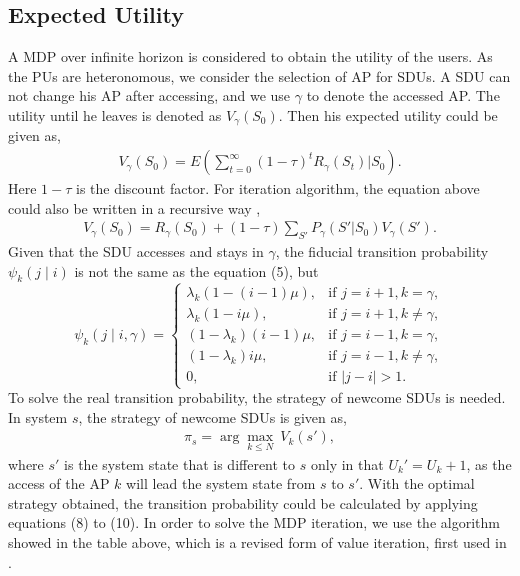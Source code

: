 \documentclass[conference]{IEEEtran}
\begin{document}
\subsection{Expected Utility}
A MDP over infinite horizon is considered to obtain the utility of the users. As the PUs are heteronomous, we consider the selection of AP for SDUs. A SDU can not change his AP after accessing, and we use \(\gamma\) to denote the accessed AP. The utility until he leaves is denoted as \(V_{\gamma}(S_0)\). Then his expected utility could be given as,
\begin{equation}
\begin{aligned}
V_{\gamma}(S_0) = E \left(\sum\limits_{t=0}^\infty (1-\tau)^t R_{\gamma}(S_t)\Bigg| S_0\right).
\end{aligned}
\end{equation}
Here \(1 - \tau\) is the discount factor. For iteration algorithm, the equation above could also be written in a recursive way \cite{26},
\begin{equation}
\begin{aligned}
V_{\gamma}(S_0) = R_{\gamma}(S_0) + (1-\tau) \sum\limits_{S'}P_{\gamma}(S'|S_0)V_{\gamma}(S').
\end{aligned}
\end{equation}
Given that the SDU accesses and stays in \(\gamma\), the fiducial transition probability \(\psi_{k}(j \mid i)\) is not the same as the equation (5), but
\begin{equation}
\psi_{k}(j \mid i, \gamma) =
\begin{cases}
\lambda_k(1- (i - 1)\mu), &\mbox{if $j=i+1,k = \gamma$},\\
\lambda_k(1- i\mu), &\mbox{if $j=i+1,k \neq \gamma$},\\
(1 - \lambda_k)(i - 1)\mu, &\mbox{if $j=i-1, k = \gamma $},\\
(1 - \lambda_k)i\mu, &\mbox{if $j=i-1, k \neq \gamma$},\\
0, &\mbox{if $|j-i|>1$}.
\end{cases}
\end{equation}
To solve the real transition probability, the strategy of newcome SDUs is needed. In system \(s\), the strategy of newcome SDUs is given as,
\begin{equation}
\begin{aligned}
\pi_s = \arg \underset {k \leq N}{\max} \ V_{k}(s'),
\end{aligned}
\end{equation}
where \(s'\) is the system state that is different to \(s\) only in that \(U_k' = U_k + 1\), as the access of the AP \(k\) will lead the system state from \(s\) to \(s'\). With the optimal strategy obtained, the transition probability could be calculated by applying equations (8) to (10). In order to solve the MDP iteration, we use the algorithm showed in the table above, which is a revised form of value iteration, first used in \cite{5}.\\
\end{document}
